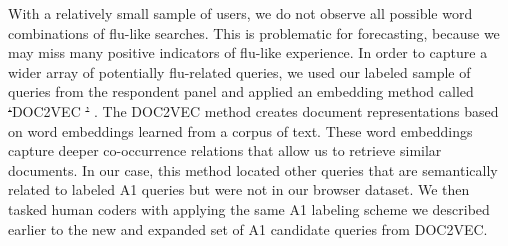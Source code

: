 \documentclass[fleqn,10pt]{wlscirep}
\providecommand{\DIFdel}[1]{{\protect\color{red}\sout{#1}}}                      %
\providecommand{\DIFdelbegin}{} %
\providecommand{\DIFdelend}{} %
\begin{document}
\DIFdelend With a relatively small sample of users, we do not observe all possible word combinations of flu-like searches. This is problematic for forecasting, because we may miss many positive indicators of flu-like experience. In order to capture a wider array of potentially flu-related queries, we used our labeled sample of queries from the respondent panel and applied an embedding method called \DIFdelbegin \DIFdel{`}\DIFdelend DOC2VEC \DIFdelbegin \DIFdel{' }\DIFdelend \cite{le_and_mikolov_2014}. The DOC2VEC method creates document representations based on word embeddings learned from a corpus of text. These word embeddings capture deeper co-occurrence relations that allow us to retrieve similar documents. In our case, this method located other queries that are semantically related to labeled A1 queries but were not in our browser dataset. We then tasked human coders with applying the same A1 labeling scheme we described earlier to the new and expanded set of A1 candidate queries from DOC2VEC. 
\end{document}
